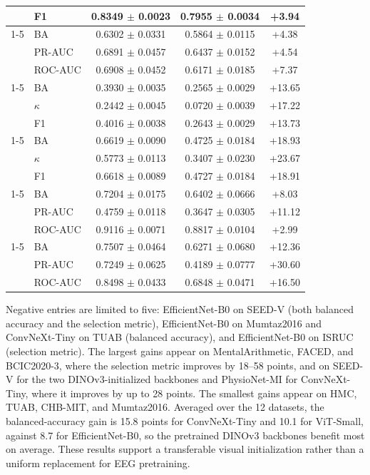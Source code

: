 \begin{table}[tbp]
\begin{tabular}{@{}l l c c c@{}}
 & F1 & 0.8349 $\pm$ 0.0023 & 0.7955 $\pm$ 0.0034 & +3.94 \\
\cmidrule(lr){1-5}
\multirow{3}{*}{SHU-MI} & BA & 0.6302 $\pm$ 0.0331 & 0.5864 $\pm$ 0.0115 & +4.38 \\
 & PR-AUC & 0.6891 $\pm$ 0.0457 & 0.6437 $\pm$ 0.0152 & +4.54 \\
 & ROC-AUC & 0.6908 $\pm$ 0.0452 & 0.6171 $\pm$ 0.0185 & +7.37 \\
\cmidrule(lr){1-5}
\multirow{3}{*}{SEED-V} & BA & 0.3930 $\pm$ 0.0035 & 0.2565 $\pm$ 0.0029 & +13.65 \\
 & $\kappa$ & 0.2442 $\pm$ 0.0045 & 0.0720 $\pm$ 0.0039 & +17.22 \\
 & F1 & 0.4016 $\pm$ 0.0038 & 0.2643 $\pm$ 0.0029 & +13.73 \\
\cmidrule(lr){1-5}
\multirow{3}{*}{BCIC2020-3} & BA & 0.6619 $\pm$ 0.0090 & 0.4725 $\pm$ 0.0184 & +18.93 \\
 & $\kappa$ & 0.5773 $\pm$ 0.0113 & 0.3407 $\pm$ 0.0230 & +23.67 \\
 & F1 & 0.6618 $\pm$ 0.0089 & 0.4727 $\pm$ 0.0184 & +18.91 \\
\cmidrule(lr){1-5}
\multirow{3}{*}{CHB-MIT} & BA & 0.7204 $\pm$ 0.0175 & 0.6402 $\pm$ 0.0666 & +8.03 \\
 & PR-AUC & 0.4759 $\pm$ 0.0118 & 0.3647 $\pm$ 0.0305 & +11.12 \\
 & ROC-AUC & 0.9116 $\pm$ 0.0071 & 0.8817 $\pm$ 0.0104 & +2.99 \\
\cmidrule(lr){1-5}
\multirow{3}{*}{MentalArithmetic} & BA & 0.7507 $\pm$ 0.0464 & 0.6271 $\pm$ 0.0680 & +12.36 \\
 & PR-AUC & 0.7249 $\pm$ 0.0625 & 0.4189 $\pm$ 0.0777 & +30.60 \\
 & ROC-AUC & 0.8498 $\pm$ 0.0433 & 0.6848 $\pm$ 0.0471 & +16.50 \\
\bottomrule\end{tabular}\end{table}

Negative entries are limited to five: EfficientNet-B0 on SEED-V (both balanced
accuracy and the selection metric), EfficientNet-B0 on Mumtaz2016 and
ConvNeXt-Tiny on TUAB (balanced accuracy), and EfficientNet-B0 on ISRUC
(selection metric). The largest gains appear on
MentalArithmetic, FACED, and BCIC2020-3, where the selection metric improves by
18--58 points, and on SEED-V for the two DINOv3-initialized backbones and
PhysioNet-MI for ConvNeXt-Tiny, where it improves by up to 28 points. The
smallest gains appear on HMC, TUAB, CHB-MIT, and Mumtaz2016. Averaged over the
12 datasets, the balanced-accuracy gain is 15.8 points for ConvNeXt-Tiny and
10.1 for ViT-Small, against 8.7 for EfficientNet-B0, so the pretrained DINOv3
backbones benefit most on average. These results support a transferable visual
initialization rather than a uniform replacement for EEG pretraining.

